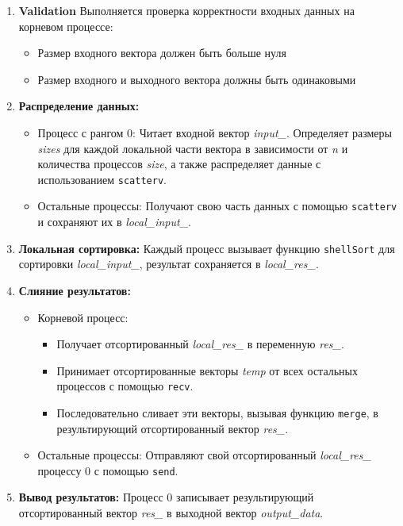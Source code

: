 \documentclass[12pt]{article}
\begin{document}
\begin{enumerate}
    \item \textbf{Validation} Выполняется проверка корректности входных данных на корневом процессе:
    \begin{itemize}
    \item Размер входного вектора должен быть больше нуля
    \item Размер входного и выходного вектора должны быть одинаковыми
    \end{itemize}
    \item \textbf{Распределение данных:}
    \begin{itemize}
        \item Процесс с рангом 0: Читает входной вектор \textit{input\_}. Определяет размеры \textit{sizes} для каждой локальной части вектора в зависимости от \textit{n} и количества процессов \textit{size}, а также распределяет данные с использованием \texttt{scatterv}.
        \item Остальные процессы: Получают свою часть данных с помощью \texttt{scatterv} и сохраняют их в \textit{local\_input\_}.
    \end{itemize}
    \item \textbf{Локальная сортировка:} Каждый процесс вызывает функцию \texttt{shellSort} для сортировки \textit{local\_input\_}, результат сохраняется в \textit{local\_res\_}.
    \item \textbf{Слияние результатов:}
    \begin{itemize}
        \item Корневой процесс:
        \begin{itemize}
            \item Получает отсортированный \textit{local\_res\_} в переменную \textit{res\_}.
            \item Принимает отсортированные векторы \textit{temp} от всех остальных процессов с помощью \texttt{recv}.
            \item Последовательно сливает эти векторы, вызывая функцию \texttt{merge}, в результирующий отсортированный вектор \textit{res\_}.
        \end{itemize}
        \item Остальные процессы: Отправляют свой отсортированный \textit{local\_res\_} процессу 0 с помощью \texttt{send}.
    \end{itemize}
    \item \textbf{Вывод результатов:} Процесс 0 записывает результирующий отсортированный вектор \textit{res\_} в выходной вектор \textit{output\_data}.
\end{enumerate}
\end{document}
